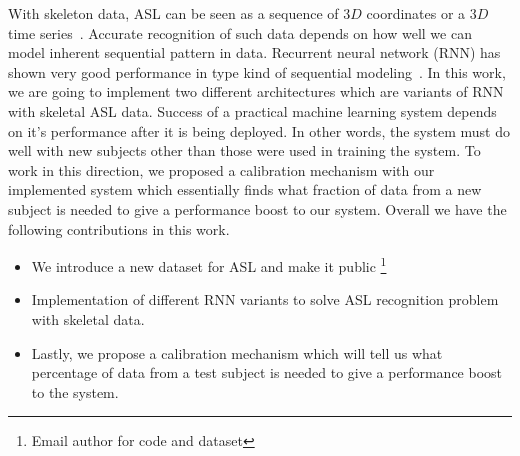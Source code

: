 \documentclass[10pt,twocolumn,letterpaper]{article}
\begin{document}
With skeleton data, ASL can be seen as a sequence of $3D$ coordinates or a $3D$ time series~\cite{7298714}. Accurate recognition of such data depends on how well we can model inherent sequential pattern in data. Recurrent neural network (RNN) has shown very good performance in type kind of sequential modeling~\cite{DBLP:journals/corr/Lipton15}. In this work, we are going to implement two different architectures which are variants of RNN with skeletal ASL data. Success of a practical machine learning system depends on it's performance after it is being deployed. In other words, the system must do well with new subjects other than those were used in training the system. To work in this direction, we proposed a calibration mechanism with our implemented system which essentially finds what fraction of data from a new subject is needed to give a performance boost to our system. Overall we have the following contributions in this work.
\begin{itemize}  
	\item We introduce a new dataset for ASL and make it public \footnote{Email author for code and dataset}
	\item Implementation of different RNN variants to solve ASL recognition problem with skeletal data.
	\item Lastly, we propose a calibration mechanism which will tell us what percentage of data from a test subject is needed to give a performance boost to the system.
\end{itemize}
\end{document}
